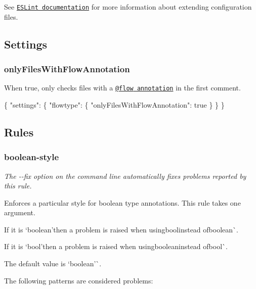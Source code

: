 See \href{http://eslint.org/docs/user-guide/configuring#extending-configuration-files}{\tt E\+S\+Lint documentation} for more information about extending configuration files.

\label{_eslint-plugin-flowtype-settings}%
 \subsection*{Settings}

\label{_eslint-plugin-flowtype-settings-onlyfileswithflowannotation}%
 \subsubsection*{{\ttfamily only\+Files\+With\+Flow\+Annotation}}

When {\ttfamily true}, only checks files with a \href{http://flowtype.org/docs/about-flow.html#gradual}{\tt {\ttfamily @flow} annotation} in the first comment.


\begin{DoxyCode}
\{
  "settings": \{
    "flowtype": \{
      "onlyFilesWithFlowAnnotation": true
    \}
  \}
\}
\end{DoxyCode}


\label{_eslint-plugin-flowtype-rules}%
 \subsection*{Rules}

\label{_eslint-plugin-flowtype-rules-boolean-style}%
 \subsubsection*{{\ttfamily boolean-\/style}}

{\itshape The {\ttfamily -\/-\/fix} option on the command line automatically fixes problems reported by this rule.}

Enforces a particular style for boolean type annotations. This rule takes one argument.

If it is `\textquotesingle{}boolean'{\ttfamily then a problem is raised when using}bool{\ttfamily instead of}boolean\`{}.

If it is `\textquotesingle{}bool'{\ttfamily then a problem is raised when using}boolean{\ttfamily instead of}bool\`{}.

The default value is `\textquotesingle{}boolean'\`{}.

The following patterns are considered problems\+:



